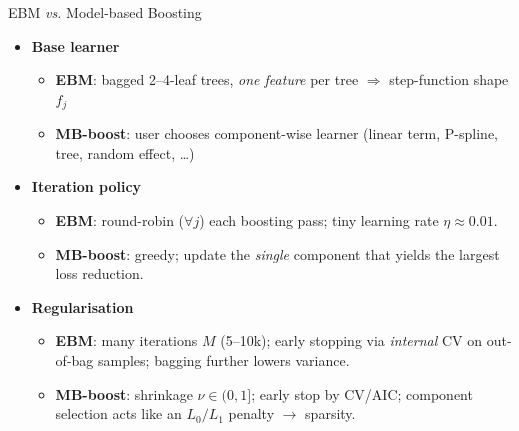\documentclass[10pt,compress,t,notes=noshow, xcolor=table]{beamer}
\begin{document}
\begin{frame}{EBM \textit{vs.} Model-based Boosting}
\small
\begin{itemize}
  \item \textbf{Base learner}
        \begin{itemize}
          \item \textbf{EBM}: bagged 2--4-leaf trees, \emph{one feature} per tree  
                $\Rightarrow$ step-function shape $f_j$  %
          \item \textbf{MB-boost}: user chooses component-wise learner  
                (linear term, P-spline, tree, random effect, \dots)  
        \end{itemize}
\pause
  \item \textbf{Iteration policy}
        \begin{itemize}
          \item \textbf{EBM}: round-robin ($\forall j$) each boosting pass; tiny
                learning rate $\eta \approx 0.01$.
          \item \textbf{MB-boost}: greedy; update the \emph{single} component that yields the largest loss reduction.
        \end{itemize}
\pause
  \item \textbf{Regularisation}
        \begin{itemize}
          \item \textbf{EBM}: many iterations $M$ (5--10k);  
                early stopping via \emph{internal} CV on out-of-bag samples;  
                bagging further lowers variance.
          \item \textbf{MB-boost}: shrinkage $\nu \in (0,1]$;  
                early stop by CV/AIC; component selection acts like an
                $L_0/L_1$ penalty $\rightarrow$ sparsity.
        \end{itemize}
\end{itemize}
\end{frame}
\end{document}
